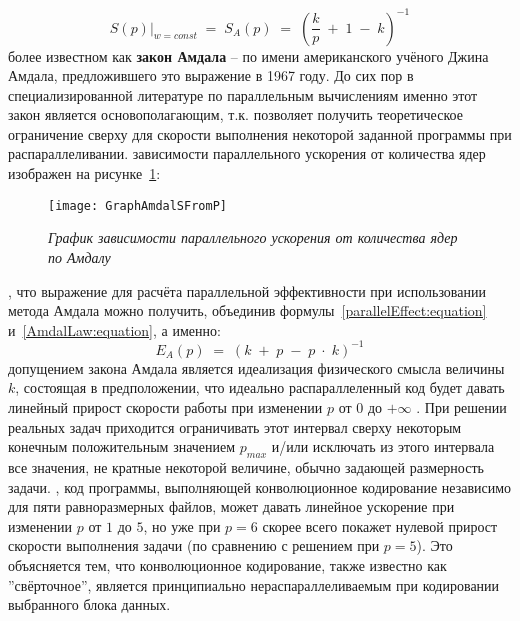 {	\begin{equation}
		\label{AmdalLaw:equation}
		\left.S(p)\right|_{w=const}\;=\;S_A(p)\;=\;\left(\frac kp\;+\;1\;-\;k\right)^{-1}
	\end{equation}
	более известном как \textbf{закон Амдала} – по имени американского учёного Джина Амдала, предложившего это выражение в 1967 году. До сих пор в специализированной литературе по параллельным вычислениям именно этот закон является основополагающим, т.к. позволяет получить теоретическое ограничение сверху для скорости выполнения некоторой заданной программы при распараллеливании.
	 зависимости параллельного ускорения от количества ядер изображен на рисунке~\ref{GraphAmdalSFromP:image}:
	\begin{figure}[H]
		\texttt{[image: GraphAmdalSFromP]}
		\caption{\textit{График зависимости параллельного ускорения от количества ядер по Амдалу}}
		\label{GraphAmdalSFromP:image}
	\end{figure}
	, что выражение для расчёта параллельной эффективности при использовании метода Амдала можно получить, объединив формулы~\eqref{parallelEffect:equation} и~\eqref{AmdalLaw:equation}, а именно:
	\begin{equation}
		E_A(p)\;=\;\left(k\;+\;p\;-\;p\;\cdot\;k\right)^{-1}
	\end{equation}
	 допущением закона Амдала является идеализация физического смысла величины $k$, состоящая в предположении, что идеально распараллеленный код будет давать линейный прирост скорости работы при изменении $p$ от $0$ до $+\infty$ . При решении реальных задач приходится ограничивать этот интервал сверху некоторым конечным положительным значением $p_{max}$ и/или исключать из этого интервала все значения, не кратные некоторой величине, обычно задающей размерность задачи.
	, код программы, выполняющей конволюционное кодирование независимо для пяти равноразмерных файлов, может давать линейное ускорение при изменении $p$ от $1$ до $5$, но уже при $p=6$ скорее всего покажет нулевой прирост скорости выполнения задачи (по сравнению с решением при $p=5$). Это объясняется тем, что  конволюционное кодирование, также известно как ''свёрточное'', является принципиально нераспараллеливаемым при кодировании выбранного блока данных.
	\par
}
